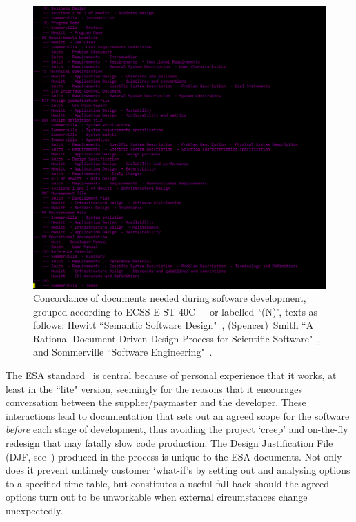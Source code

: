 \begin{figure}
\centerline{\includegraphics[height=0.9\textheight]{../png/multstruct}}
\caption{Concordance of documents needed during software development,
grouped according to ECSS-E-ST-40C~ - or labelled~`(N)',
texts as follows:
Hewitt ``Semantic Software Design"~,
(Spencer)~Smith ``A Rational Document Driven Design Process for Scientific Software"~,
and Sommerville ``Software Engineering"~.
\label{fig:multstruct}}
\end{figure}

The ESA standard~\cite{ecss40exc} is central because of personal experience that it works, at least in the
``lite" version, seemingly for the reasons that it encourages conversation between the
supplier/paymaster and the developer. These  interactions lead to documentation that
sets out an agreed scope for the software \emph{before} each stage of development,
thus avoiding the project `creep' and on-the-fly redesign that may fatally slow code production.
The Design Justification File (DJF, see~) produced in the process is unique to the ESA documents. Not only does
it prevent untimely customer `what-if's  by setting out and analysing options to a specified time-table,
but constitutes a useful fall-back should the agreed options turn out to be
unworkable when external circumstances change unexpectedly. 

